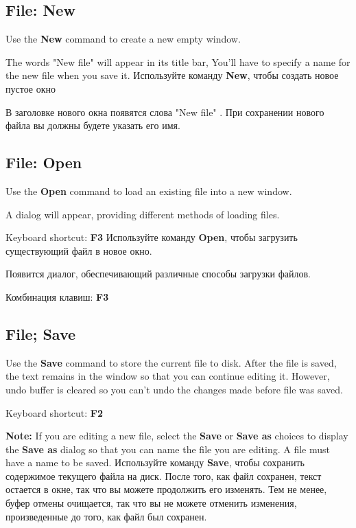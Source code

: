 \subsection{File: New}

\ifenglish
Use the {\bf New} command to create a new empty window.

The words "New file" will appear in its title bar,
You'll have to specify a name for the new file when you save it.
\else
Используйте команду {\bf New}, чтобы создать новое пустое окно

В заголовке нового окна появятся слова "New file" .
При сохранении нового файла вы должны будете указать его имя.
\fi

\subsection{File: Open}

\ifenglish
Use the {\bf Open} command to load an existing file into
a new window.

A dialog will appear, providing different methods of
loading files.

Keyboard shortcut: {\bf F3}
\else
Используйте команду {\bf Open}, чтобы загрузить существующий файл в новое 
окно.

Появится диалог, обеспечивающий различные способы загрузки файлов.

Комбинация клавиш: {\bf F3} 
\fi

\subsection{File; Save}

\ifenglish
Use the {\bf Save} command to store the current file to disk.
After the file is saved, the text remains in the window
so that you can continue editing it. However, undo buffer is cleared
so you can't undo the changes made before file was saved.

Keyboard shortcut: {\bf F2}

{\bf Note:} If you are editing a new file, select the
{\bf Save} or {\bf Save as} choices to display the
{\bf Save as} dialog so that you can name the file you are editing.
A file must have a name to be saved.
\else
Используйте команду {\bf Save}, чтобы сохранить содержимое текущего файла на 
диск. После того, как файл сохранен, текст остается в окне, так что вы можете 
продолжить его изменять. Тем не менее, буфер отмены очищается, так что вы не 
можете отменить изменения, произведенные до того, как файл был сохранен.

